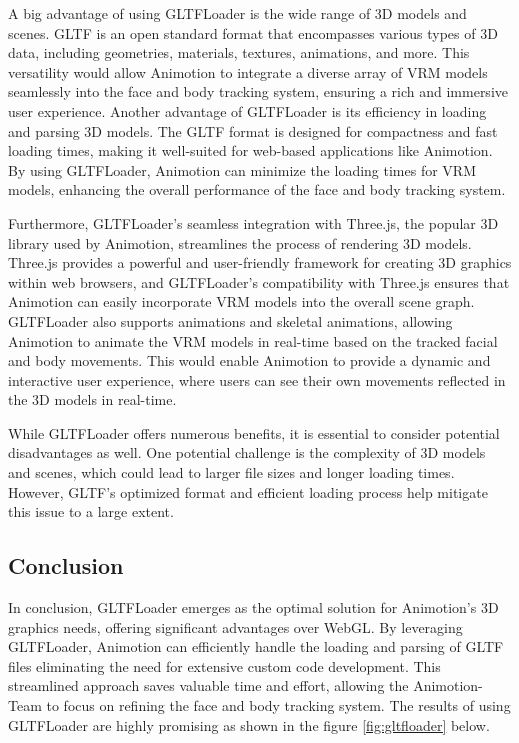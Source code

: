 A big advantage of using GLTFLoader is the wide range of 3D models and scenes. 
GLTF is an open standard format that encompasses various types of 3D data, including geometries, materials, textures, 
animations, and more. This versatility would allow Animotion to integrate a diverse array of VRM models seamlessly 
into the face and body tracking system, ensuring a rich and immersive user experience.
Another advantage of GLTFLoader is its efficiency in loading and parsing 3D models. The GLTF format is designed 
for compactness and fast loading times, making it well-suited for web-based applications like Animotion. 
By using GLTFLoader, Animotion can minimize the loading times for VRM models, enhancing 
the overall performance of the face and body tracking system. \cite{GLTFLoader}

Furthermore, GLTFLoader's seamless integration with Three.js, the popular 3D library used by 
Animotion, streamlines the process of rendering 3D models. Three.js provides a powerful and user-friendly framework 
for creating 3D graphics within web browsers, and GLTFLoader's compatibility with Three.js ensures that Animotion 
can easily incorporate VRM models into the overall scene graph. GLTFLoader also supports animations and skeletal animations, allowing Animotion to animate the 
VRM models in real-time based on the tracked facial and body movements. This would enable Animotion to provide 
a dynamic and interactive user experience, where users can see their own movements reflected in the 3D models in real-time. \cite{GLTFLoaderWithVRM}

While GLTFLoader offers numerous benefits, it is essential to consider potential disadvantages as well. 
One potential challenge is the complexity of 3D models and scenes, which could lead to larger file sizes 
and longer loading times. However, GLTF's optimized format and efficient loading process help mitigate this issue to a large extent.

\subsection{Conclusion}
In conclusion, GLTFLoader emerges as the optimal solution for Animotion's 3D graphics needs, 
offering significant advantages over WebGL. By leveraging GLTFLoader, Animotion can efficiently 
handle the loading and parsing of GLTF files
eliminating the need for extensive custom code development. This streamlined approach saves valuable 
time and effort, allowing the Animotion-Team to focus on refining the face and body tracking system.
The results of using GLTFLoader are highly promising as shown in the figure \ref{fig:gltfloader} below. 

